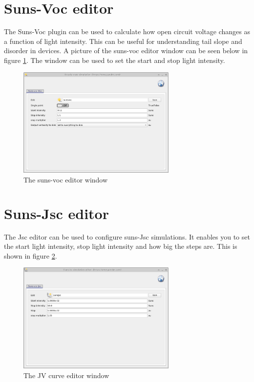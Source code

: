 


\section{Suns-Voc editor}
The Suns-Voc plugin can be used to calculate how open circuit voltage changes as a function of light intensity.  This can be useful for understanding tail slope and disorder in devices.  A picture of the suns-voc editor window can be seen below in figure \ref{fig:sunsvoceditor}.  The window can be used to set the start and stop light intensity.

\begin{figure}[H]
\centering
\includegraphics[width=0.7\textwidth,height=0.5\textwidth]{./images/suns_voc_editor.png}
\caption{The suns-voc editor window}
\label{fig:sunsvoceditor}
\end{figure}


\section{Suns-Jsc editor}
The Jsc editor can be used to configure suns-Jsc simulations. It enables you to set the start light intensity, stop light intensity and how big the steps are. This is shown in figure \ref{fig:sunsjsceditor}.

\begin{figure}[H]
\centering
\includegraphics[width=0.7\textwidth,height=0.5\textwidth]{./images/suns_jsc_editor.png}
\caption{The JV curve editor window}
\label{fig:sunsjsceditor}
\end{figure}


